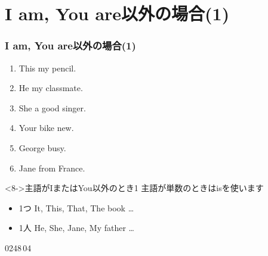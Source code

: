 \documentclass[aspectratio=169,xcolor={dvipsnames,table}]{beamer}
\begin{document}
\section{I am, You are以外の場合(1)}
\begin{frame}[plain,label=recap_1]\frametitle{I am, You are以外の場合(1)}
  \begin{enumerate}
   \item<1-> This \textbf{\color{Maroon}{is}} my pencil. \hfill{}
   \item<1-> He \textbf{\color{Maroon}{is}} my classmate. \hfill{}
   \item<1-> She \textbf{\color{Maroon}{is}} a good singer. \hfill{}
   \item<1-> Your bike \textbf{\color{Maroon}{is}} new. \hfill{}
   \item<1-> George \textbf{\color{Maroon}{is}} busy. \hfill{}
   \item<1-> Jane \textbf{\color{Maroon}{is}} from France. \hfill{}
  \end{enumerate}

\vfill

\begin{block}<8->{主語がIまたはYou以外のとき1}\small
主語が単数のときはisを使います
\begin{itemize}[square]
 \item 1つ It, This, That, The book \ldots{} 
 \item 1人 He, She, Jane, My father \ldots{} 
\end{itemize}  
     \end{block}

\hfill{\tiny 0248}\,{\tiny {}04}

\end{frame}
\end{document}
